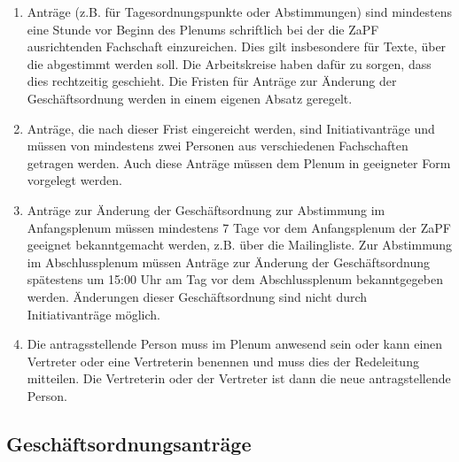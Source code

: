 \documentclass[draft,12pt,oneside]{scrreprt}
\begin{document}
\begin{enumerate}
  \item Anträge (z.B. für Tagesordnungspunkte oder Abstimmungen) sind mindestens
        eine Stunde vor Beginn des Plenums schriftlich bei der die ZaPF
        ausrichtenden Fachschaft einzureichen.
        Dies gilt insbesondere für Texte, über die abgestimmt werden soll.
        Die Arbeitskreise haben dafür zu sorgen, dass dies rechtzeitig geschieht.
        Die Fristen für Anträge zur Änderung der Geschäftsordnung werden in einem
        eigenen Absatz geregelt.

  \item Anträge, die nach dieser Frist eingereicht werden, sind Initiativanträge
        und müssen von mindestens zwei Personen aus verschiedenen Fachschaften
        getragen werden. Auch diese Anträge müssen dem Plenum in geeigneter Form
        vorgelegt werden.

  \item Anträge zur Änderung der Geschäftsordnung zur Abstimmung im Anfangsplenum
        müssen mindestens 7 Tage vor dem Anfangsplenum der ZaPF geeignet
        bekanntgemacht werden, z.B. über die Mailingliste.
        Zur Abstimmung im Abschlussplenum müssen Anträge zur Änderung der
        Geschäftsordnung spätestens um 15:00 Uhr am Tag vor dem Abschlussplenum
        bekanntgegeben werden.
        Änderungen dieser Geschäftsordnung sind nicht durch Initiativanträge möglich.

  \item Die antragsstellende Person muss im Plenum anwesend sein
        oder kann einen Vertreter oder eine Vertreterin benennen und muss dies
        der Redeleitung mitteilen.
        Die Vertreterin oder der Vertreter ist dann die neue antragstellende Person.
\end{enumerate}

\subsection{Geschäftsordnungsanträge}
\end{document}
